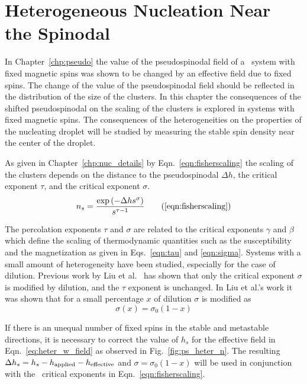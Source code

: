 

\chapter{\label{chp:het_nucl}Heterogeneous Nucleation Near the Spinodal}

In Chapter~\ref{chp:pseudo} the value of the pseudospinodal field of a \het\ system with fixed magnetic spins was shown to be changed by an effective field due to    fixed spins. The change of the value of the pseudospinodal field should be reflected in the distribution of the size of the clusters. In this chapter the consequences of the shifted pseudospinodal on the scaling of the clusters is explored in systems with fixed magnetic spins. The consequences of the heterogeneities on the properties of the nucleating droplet will be studied by measuring the stable spin density near the center of the droplet. 

As given in Chapter~\ref{chp:nuc_details} by Eqn.~\eqref{eqn:fisherscaling} the scaling of the clusters depends on the distance to the pseudospinodal $\Delta h$, the critical exponent $\tau$, and the critical exponent $\sigma$. 
\begin{equation}
n_s = \frac{\exp{(-\Delta h s^\sigma)}}{s^{\tau-1}}
\tag{\ref{eqn:fisherscaling}}
\end{equation}%

The percolation exponents $\tau$ and $\sigma$ are related to the critical exponents $\gamma$ and $\beta$ which define the scaling of thermodynamic quantities such as the susceptibility and the magnetization as given in Eqs.~\eqref{eqn:tau} and \eqref{eqn:sigma}. Systems with a small amount of heterogeneity have been studied, especially for the case of dilution. Previous work by Liu et al.~\cite{kangdilute} has shown that only the  critical exponent $\sigma$ is modified by dilution, and the $\tau$  exponent is unchanged. In Liu et al.'s work it was shown that for a small percentage $x$ of dilution $\sigma$ is modified as
\begin{equation}
\label{eqn:sigmamod}
\sigma(x) = \sigma_0 (1-x)
\end{equation}%

If there is an unequal number of fixed spins in the stable and metastable directions,  it is necessary to correct the value of $h_s$ for the effective field in Eqn.~\eqref{eq:heter_w_field} as observed in Fig.~\ref{fig:ps_heter_n}. The resulting $\Delta h_s = h_s - h_{\rm applied} - h_{\rm effective}$ and $\sigma = \sigma_0 (1-x)$ will be used in conjunction with the \mf\ critical exponents in Eqn.~\eqref{eqn:fisherscaling}. 

